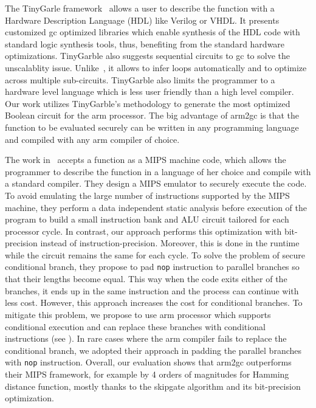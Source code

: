 The TinyGarle framework~\cite{songhori2015tinygarble} allows a user to describe the function with a Hardware Description Language (HDL) like Verilog or VHDL.
It presents customized \acrshort{gc} optimized libraries which enable synthesis of the HDL code with standard logic synthesis tools, thus, benefiting from the standard hardware optimizations.
TinyGarble also suggests sequential circuits to \acrshort{gc} to solve the unscalablity issue.
Unlike~\cite{kreuter2013pcf}, it allows to infer loops automatically and to optimize across multiple sub-circuits.
TinyGarble also limits the programmer to a hardware level language which is less user friendly than a high level compiler.
Our work utilizes TinyGarble's methodology to generate the most optimized Boolean circuit for the \gls{arm} processor.
The big advantage of \gls{arm2gc} is that the function to be evaluated securely can be written in any programming language and compiled with any \gls{arm} compiler of choice.

The work in~\cite{wang2016secure} accepts a function as a MIPS machine code, which allows the programmer to describe the function in a language of her choice and compile with a standard compiler.
They design a MIPS emulator to securely execute the code.
To avoid emulating the large number of instructions supported by the MIPS machine, they perform a data independent static analysis before execution of the program to build a small instruction bank and ALU circuit tailored for each processor cycle.
In contrast, our approach performs this optimization with bit-precision instead of instruction-precision.
Moreover, this is done in the runtime while the circuit remains the same for each cycle.
To solve the problem of secure conditional branch, they propose to pad \texttt{nop} instruction to parallel branches so that their lengths become equal.
This way when the code exits either of the branches, it ends up in the same instruction and the process can continue with less cost.
However, this approach increases the cost for conditional branches.
To mitigate this problem, we propose to use \gls{arm} processor which supports conditional execution and can replace these branches with conditional instructions (see ).
In rare cases where the \gls{arm} compiler fails to replace the conditional branch, we adopted their approach in padding the parallel branches with \texttt{nop} instruction.
Overall, our evaluation shows that \gls{arm2gc} outperforms their MIPS framework, for example by 4 orders of magnitudes for Hamming distance function, mostly thanks to the \gls{skipgate} algorithm and its bit-precision optimization.

